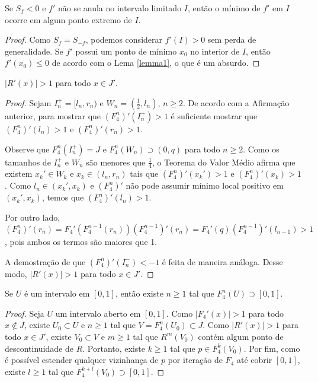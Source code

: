 \begin{affirmation}
Se $S_f < 0$ e $f'$ não se anula no intervalo limitado $I$, então o mínimo de $f'$ em $I$ ocorre em algum ponto extremo de $I$.
\end{affirmation}

\begin{proof}
Como $S_f = S_{-f}$, podemos considerar $f'(I) > 0$ sem perda de generalidade. Se $f'$ possui um ponto de mínimo $x_0$ no interior de $I$, então $f'(x_0) \leq 0$ de acordo com o Lema \ref{lemma1}, o que é um absurdo.
\end{proof}

\begin{affirmation}
$|R'(x)| > 1$ para todo $x \in J'$.
\end{affirmation}

\begin{proof}
Sejam $I^+_n = [l_n, r_n)$ e $W_n = (\frac{1}{2}, l_n)$, $n \geq 2$. De acordo com a Afirmação anterior, para mostrar que $(F_4^n)'(I^+_n) > 1$ é suficiente mostrar que $(F_4^n)'(l_n) > 1$ e $(F_4^n)'(r_n) > 1$.

Observe que $F_4^n(I^+_n) = J$ e $F_4^n(W_n) \supset (0,q)$ para todo $n \geq 2$. Como os tamanhos de $I^+_n$ e $W_n$ são menores que $\frac{1}{4}$, o Teorema do Valor Médio afirma que existem $x_k' \in W_k$ e $x_k \in (l_n, r_n)$ tais que $(F_4^n)'(x_k') > 1$ e $(F_4^n)'(x_k) > 1$. Como $l_n \in (x_k', x_k)$ e $(F_4^n)'$ não pode assumir mínimo local positivo em $(x_k',x_k)$, temos que $(F_4^n)'(l_n) > 1$.

Por outro lado, $(F_4^n)'(r_n) = F_4'(F_4^{n-1}(r_n)) (F_4^{n-1})'(r_n) =  F_4'(q) (F_4^{n-1})'(l_{n-1}) > 1$, pois ambos os termos são maiores que 1.

A demostração de que $(F_4^n)'(I^-_n) < -1$ é feita de maneira análoga. Desse modo, $|R'(x)| > 1$ para todo $x \in J'$.
\end{proof}

\begin{affirmation}
Se $U$ é um intervalo em $[0, 1]$, então existe $n \geq 1$ tal que $F_4^n(U) \supset [0, 1]$.
\end{affirmation}

\begin{proof}
Seja $U$ um intervalo aberto em $[0,1]$. Como $|F_4'(x)| > 1$ para todo $x \notin J$, existe $U_0 \subset U$ e $n \geq 1$ tal que $V = F_4^n(U_0) \subset J$. Como $|R'(x)| > 1$ para todo $x \in J'$, existe $V_0 \subset V$ e $m \geq 1$ tal que $R^m(V_0)$ contém algum ponto de descontinuidade de $R$. Portanto, existe $k \geq 1$ tal que $p \in F_4^k(V_0)$. Por fim, 
como é possível estender qualquer vizinhança de $p$ por iteração de $F_4$ até cobrir $[0,1]$, existe $l \geq 1$ tal que $F_4^{k+l}(V_0) \supset [0,1]$.
\end{proof}

